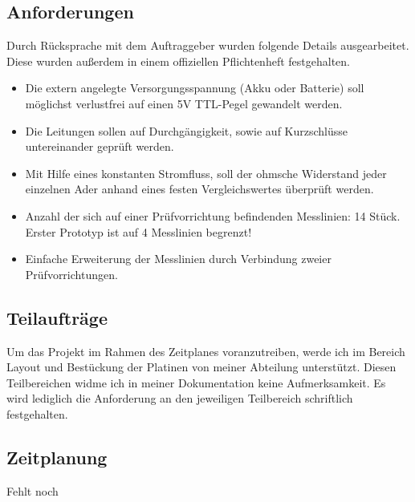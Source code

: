 \subsection{Anforderungen}

Durch Rücksprache mit dem Auftraggeber wurden folgende Details ausgearbeitet. Diese wurden außerdem in einem offiziellen Pflichtenheft festgehalten. 

\begin{itemize}
	\item{Die extern angelegte Versorgungsspannung (Akku oder Batterie) soll möglichst verlustfrei auf einen 5V TTL-Pegel gewandelt werden. }

	\item{Die Leitungen sollen auf Durchgängigkeit, sowie auf Kurzschlüsse untereinander geprüft werden.}
	
	\item{Mit Hilfe eines konstanten Stromfluss, soll der ohmsche Widerstand jeder einzelnen Ader anhand eines festen Vergleichswertes überprüft werden.}
	
	\item{Anzahl der sich auf einer Prüfvorrichtung befindenden Messlinien: 14 Stück.
Erster Prototyp ist auf 4 Messlinien begrenzt!}

	\item{Einfache Erweiterung der Messlinien durch Verbindung zweier Prüfvorrichtungen.}
\end{itemize}


\subsection{Teilaufträge}
Um das Projekt im Rahmen des Zeitplanes voranzutreiben, werde ich im Bereich Layout und Bestückung der Platinen von meiner Abteilung unterstützt. Diesen Teilbereichen widme ich in meiner Dokumentation keine Aufmerksamkeit. Es wird lediglich die Anforderung an den jeweiligen Teilbereich schriftlich festgehalten.

\newpage

\subsection{Zeitplanung}
Fehlt noch
